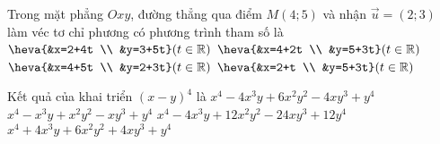 \begin{ex}%
	Trong mặt phẳng $Oxy$, đường thẳng qua điểm $M(4; 5)$ và nhận $\vec{u}=(2; 3)$ làm véc tơ chỉ phương có phương trình tham số là
	\choice
	{$\heva{&x=2+4t \\ &y=3+5t}(t \in \mathbb{R})$}
	{\True $\heva{&x=4+2t \\ &y=5+3t}(t \in \mathbb{R})$}
	{$\heva{&x=4+5t \\ &y=2+3t}(t \in \mathbb{R})$}
	{$\heva{&x=2+t \\ &y=5+3t}(t \in \mathbb{R})$}
\end{ex}

\begin{ex}%
	Kết quả của khai triển $(x-y)^4$ là
	\choice
	{\True $x^4-4 x^3y+6 x^2y^2-4 xy^3+y^4$}
	{$x^4-x^3 y+x^2 y^2-x y^3+y^4$}
	{$x^4-4 x^3 y+12 x^2 y^2-24 x y^3+12 y^4$}
	{$x^4+4 x^3 y+6 x^2 y^2+4 x y^3+y^4$}
\end{ex}


